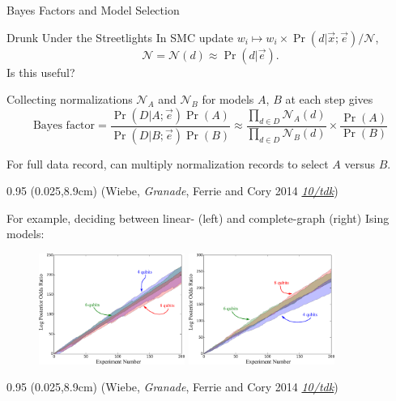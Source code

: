 \documentclass[xcolor=dvipsnames, compress]{beamer}
\renewcommand\UrlFont{\color{red}\rmfamily\itshape}
\newcommand{\shortdoi}[1]{\href{http://doi.org/#1}{\UrlFont 10/#1}}
\newcommand{\bottomnote}[1]{
  \begin{textblock*}{0.95\paperwidth} (0.025\paperwidth,8.9cm)
    {\tiny \hfill #1}
  \end{textblock*}
}
\begin{document}
\begin{frame}{Bayes Factors and Model Selection}

  
  \begin{block}{Drunk Under the Streetlights}
    In SMC update $w_i \mapsto w_i \times \Pr(d | \vec{x}; \vec{e}) / \mathcal{N}$,
    $$
      \mathcal{N} = \mathcal{N}(d) \approx \Pr(d | \vec{e}).
    $$
    Is this useful?
  \end{block}

  \pause

  Collecting normalizations $\mathcal{N}_A$ and $\mathcal{N}_B$
  for models $A$, $B$ at each step gives
  $$
    \text{Bayes factor} = \frac{\Pr(D | A; \vec{e}) \Pr(A)}{\Pr(D | B; \vec{e}) \Pr(B)}
    \approx \frac{\prod_{d\in D}\mathcal{N}_A(d)}{\prod_{d\in D}\mathcal{N}_B(d)}
    \times \frac{\Pr(A)}{\Pr(B)} 
  $$

  For full data record, can multiply normalization records to select $A$ versus $B$.

  \bottomnote{(Wiebe, \emph{Granade}, Ferrie and Cory 2014 \shortdoi{tdk})}

\end{frame}

\begin{frame}

  For example, deciding between linear- (left) and complete-graph (right) Ising models:

  \begin{figure}
    \centering
    \includegraphics[width=0.425\textwidth]{figures/modelselect_linetrue}
    \includegraphics[width=0.425\textwidth]{figures/modelselect_completetrue}
  \end{figure}

  \bottomnote{(Wiebe, \emph{Granade}, Ferrie and Cory 2014 \shortdoi{tdk})}

\end{frame}
\end{document}
